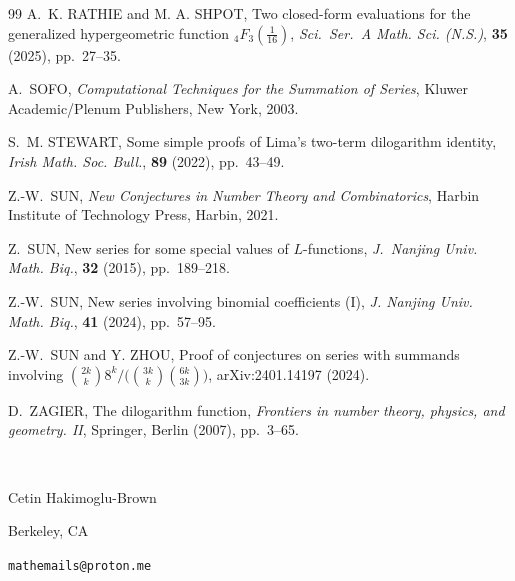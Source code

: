 \documentclass[12pt]{article}
\begin{document}
\begin{thebibliography}{99}
 A.\ K. RATHIE and M. A. SHPOT, 
 Two closed-form evaluations for the generalized hypergeometric function {$_4F_3(\frac1{16})$}, 
 \textit{Sci.\ Ser.\ A Math. Sci. (N.S.)}, \textbf{35} (2025), pp.\ 27--35. 

 A.\ SOFO, 
 \textit{Computational Techniques for the Summation of Series}, 
 Kluwer Academic/Plenum Publishers, New York, 2003. 

 S.\ M. STEWART, 
 Some simple proofs of {L}ima's two-term dilogarithm identity, 
 \textit{Irish Math. Soc. Bull.}, \textbf{89} (2022), pp.\ 43--49. 

 Z.-W.\ SUN, 
 \textit{New Conjectures in Number Theory and Combinatorics}, 
 Harbin Institute of Technology Press, Harbin, 2021. 

 Z.\ SUN, 
 New series for some special values of $L$-functions, 
 \textit{J.\ Nanjing Univ. Math. Biq.}, \textbf{32} (2015), pp.\ 189--218. 

 Z.-W.\ SUN, 
 New series involving binomial coefficients (I), 
 \textit{J. Nanjing Univ. Math. Biq.}, \textbf{41} (2024), pp.\ 57--95. 

 Z.-W.\ SUN and Y. ZHOU, 
 Proof of conjectures on series with summands involving $\binom{2k}{k} 8^k /\big( \binom{3k}{k} \binom{6k}{3k} \big)$, 
 arXiv:2401.14197 (2024). 

 D.\ ZAGIER, 
 The dilogarithm function, 
 \textit{Frontiers in number theory, physics, and geometry. {II}}, 
 Springer, Berlin (2007), pp.\ 3--65. 

\end{thebibliography}

 \

Cetin Hakimoglu-Brown

Berkeley, CA

{\tt mathemails@proton.me}
\end{document}
